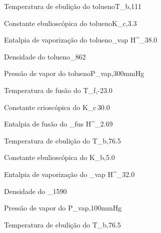 
{Temperatura de ebulição do tolueno}{T_{b,}}{111}{\celsius}

{Constante ebulioscópica do tolueno}{K_{c,}}{3.3}{\kilo\gram\kelvin\per\mol}

{Entalpia de vaporização do tolueno}{\Delta_{vap} H^{\standardstate}_{}}{38.0}{\kilo\joule\per\mol}

{Densidade do tolueno}{\rho_{}}{862}{\kilo\gram\per\cubic\meter}

{Pressão de vapor do tolueno}{P_{vap,}}{300}{mmHg}


{Temperatura de fusão do }{T_{f,}}{-23.0}{\celsius}

{Constante crioscópica do }{K_{c\,}}{30.0}{\kilo\gram\kelvin\per\mol}

{Entalpia de fusão do }{\Delta_{fus} H^{\standardstate}_{}}{2.69}{\kilo\joule\per\mol}

{Temperatura de ebulição do }{T_{b,}}{76.5}{\celsius}

{Constante ebulioscópica do }{K_{b,}}{5.0}{\kilo\gram\kelvin\per\mol}

{Entalpia de vaporização do }{\Delta_{vap} H^{\standardstate}_{}}{32.0}{\kilo\joule\per\mol}

{Densidade do }{\rho_{}}{1590}{\kilo\gram\per\cubic\meter}

{Pressão de vapor do }{P_{vap,}}{100}{mmHg}

{Temperatura de ebulição do }{T_{b,}}{76.5}{\celsius}

%                                              
%                                              

